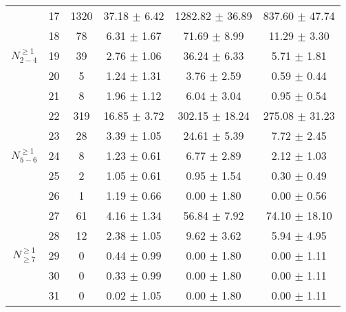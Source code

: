 \begin{table} [h!]
\begin{tabular}{c|c|c|c|c|c}
\hline
\multirow{5}{*}{$N_{2-4}^{\geq1}$}
& 17   &  1320  &   37.18 $\pm$ 6.42  &    1282.82 $\pm$ 36.89   & 837.60 $\pm$ 47.74 \\ 
& 18   &  78  &   6.31 $\pm$ 1.67  &    71.69 $\pm$ 8.99   & 11.29 $\pm$ 3.30 \\ 
& 19   &  39  &   2.76 $\pm$ 1.06  &    36.24 $\pm$ 6.33   & 5.71 $\pm$ 1.81 \\ 
& 20   &  5  &   1.24 $\pm$ 1.31  &    3.76 $\pm$ 2.59   & 0.59 $\pm$ 0.44 \\ 
& 21   &  8  &   1.96 $\pm$ 1.12  &    6.04 $\pm$ 3.04   & 0.95 $\pm$ 0.54 \\ 
\hline
\multirow{5}{*}{$N_{5-6}^{\geq1}$}
& 22   &  319  &   16.85 $\pm$ 3.72  &    302.15 $\pm$ 18.24   & 275.08 $\pm$ 31.23 \\ 
& 23   &  28  &   3.39 $\pm$ 1.05  &    24.61 $\pm$ 5.39   & 7.72 $\pm$ 2.45 \\ 
& 24   &  8  &   1.23 $\pm$ 0.61  &    6.77 $\pm$ 2.89   & 2.12 $\pm$ 1.03 \\ 
& 25   &  2  &   1.05 $\pm$ 0.61  &    0.95 $\pm$ 1.54   & 0.30 $\pm$ 0.49 \\ 
& 26   &  1  &   1.19 $\pm$ 0.66  &    0.00 $\pm$ 1.80   & 0.00 $\pm$ 0.56 \\ 
\hline
\multirow{5}{*}{$N_{\geq7}^{\geq1}$}
& 27   &  61  &   4.16 $\pm$ 1.34  &    56.84 $\pm$ 7.92   & 74.10 $\pm$ 18.10 \\ 
& 28   &  12  &   2.38 $\pm$ 1.05  &    9.62 $\pm$ 3.62   & 5.94 $\pm$ 4.95 \\ 
& 29   &  0  &   0.44 $\pm$ 0.99  &    0.00 $\pm$ 1.80   & 0.00 $\pm$ 1.11 \\ 
& 30   &  0  &   0.33 $\pm$ 0.99  &    0.00 $\pm$ 1.80   & 0.00 $\pm$ 1.11 \\ 
& 31   &  0  &   0.02 $\pm$ 1.05  &    0.00 $\pm$ 1.80   & 0.00 $\pm$ 1.11 \\ 
\hline
\end{tabular}
\end{table}

   
